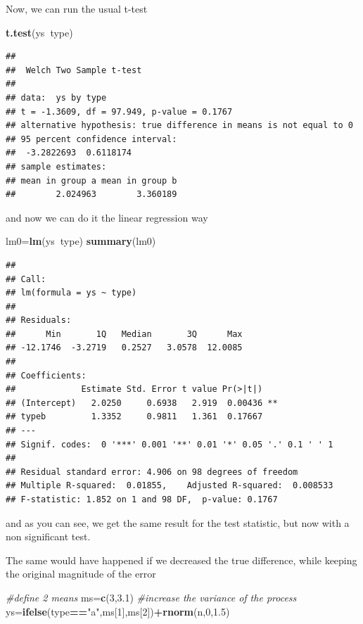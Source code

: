 \documentclass[
]{book}
\newenvironment{Shaded}{\begin{snugshade}}{\end{snugshade}}
\newcommand{\CommentTok}[1]{\textcolor[rgb]{0.56,0.35,0.01}{\textit{#1}}}
\newcommand{\DecValTok}[1]{\textcolor[rgb]{0.00,0.00,0.81}{#1}}
\newcommand{\FloatTok}[1]{\textcolor[rgb]{0.00,0.00,0.81}{#1}}
\newcommand{\KeywordTok}[1]{\textcolor[rgb]{0.13,0.29,0.53}{\textbf{#1}}}
\newcommand{\NormalTok}[1]{#1}
\newcommand{\OperatorTok}[1]{\textcolor[rgb]{0.81,0.36,0.00}{\textbf{#1}}}
\newcommand{\StringTok}[1]{\textcolor[rgb]{0.31,0.60,0.02}{#1}}
\begin{document}
Now, we can run the usual t-test

\begin{Shaded}
\begin{Highlighting}[]
\KeywordTok{t.test}\NormalTok{(ys}\OperatorTok{~}\NormalTok{type)}
\end{Highlighting}
\end{Shaded}

\begin{verbatim}
## 
## 	Welch Two Sample t-test
## 
## data:  ys by type
## t = -1.3609, df = 97.949, p-value = 0.1767
## alternative hypothesis: true difference in means is not equal to 0
## 95 percent confidence interval:
##  -3.2822693  0.6118174
## sample estimates:
## mean in group a mean in group b 
##        2.024963        3.360189
\end{verbatim}

and now we can do it the linear regression way

\begin{Shaded}
\begin{Highlighting}[]
\NormalTok{lm0=}\KeywordTok{lm}\NormalTok{(ys}\OperatorTok{~}\NormalTok{type)}
\KeywordTok{summary}\NormalTok{(lm0)}
\end{Highlighting}
\end{Shaded}

\begin{verbatim}
## 
## Call:
## lm(formula = ys ~ type)
## 
## Residuals:
##      Min       1Q   Median       3Q      Max 
## -12.1746  -3.2719   0.2527   3.0578  12.0085 
## 
## Coefficients:
##             Estimate Std. Error t value Pr(>|t|)   
## (Intercept)   2.0250     0.6938   2.919  0.00436 **
## typeb         1.3352     0.9811   1.361  0.17667   
## ---
## Signif. codes:  0 '***' 0.001 '**' 0.01 '*' 0.05 '.' 0.1 ' ' 1
## 
## Residual standard error: 4.906 on 98 degrees of freedom
## Multiple R-squared:  0.01855,	Adjusted R-squared:  0.008533 
## F-statistic: 1.852 on 1 and 98 DF,  p-value: 0.1767
\end{verbatim}

and as you can see, we get the same result for the test statistic, but now with a non significant test.

The same would have happened if we decreased the true difference, while keeping the original magnitude of the error

\begin{Shaded}
\begin{Highlighting}[]
\CommentTok{#define 2 means}
\NormalTok{ms=}\KeywordTok{c}\NormalTok{(}\DecValTok{3}\NormalTok{,}\FloatTok{3.1}\NormalTok{)}
\CommentTok{#increase the variance of the process}
\NormalTok{ys=}\KeywordTok{ifelse}\NormalTok{(type}\OperatorTok{==}\StringTok{"a"}\NormalTok{,ms[}\DecValTok{1}\NormalTok{],ms[}\DecValTok{2}\NormalTok{])}\OperatorTok{+}\KeywordTok{rnorm}\NormalTok{(n,}\DecValTok{0}\NormalTok{,}\FloatTok{1.5}\NormalTok{)}
\end{Highlighting}
\end{Shaded}
\end{document}
